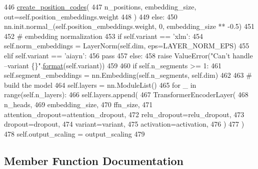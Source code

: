 \begin{DoxyCode}
446             \hyperlink{namespaceparlai_1_1agents_1_1transformer_1_1modules_a0b86437e6e9682fa3100e9cadcaae259}{create\_position\_codes}(
447                 n\_positions, embedding\_size, out=self.position\_embeddings.weight
448             )
449         \textcolor{keywordflow}{else}:
450             nn.init.normal\_(self.position\_embeddings.weight, 0, embedding\_size ** -0.5)
451 
452         \textcolor{comment}{# embedding normalization}
453         \textcolor{keywordflow}{if} self.variant == \textcolor{stringliteral}{'xlm'}:
454             self.norm\_embeddings = LayerNorm(self.dim, eps=LAYER\_NORM\_EPS)
455         \textcolor{keywordflow}{elif} self.variant == \textcolor{stringliteral}{'aiayn'}:
456             \textcolor{keywordflow}{pass}
457         \textcolor{keywordflow}{else}:
458             \textcolor{keywordflow}{raise} ValueError(\textcolor{stringliteral}{"Can't handle --variant \{\}"}.\hyperlink{namespaceparlai_1_1chat__service_1_1services_1_1messenger_1_1shared__utils_a32e2e2022b824fbaf80c747160b52a76}{format}(self.variant))
459 
460         \textcolor{keywordflow}{if} self.n\_segments >= 1:
461             self.segment\_embeddings = nn.Embedding(self.n\_segments, self.dim)
462 
463         \textcolor{comment}{# build the model}
464         self.layers = nn.ModuleList()
465         \textcolor{keywordflow}{for} \_ \textcolor{keywordflow}{in} range(self.n\_layers):
466             self.layers.append(
467                 TransformerEncoderLayer(
468                     n\_heads,
469                     embedding\_size,
470                     ffn\_size,
471                     attention\_dropout=attention\_dropout,
472                     relu\_dropout=relu\_dropout,
473                     dropout=dropout,
474                     variant=variant,
475                     activation=activation,
476                 )
477             )
478         self.output\_scaling = output\_scaling
479 
\end{DoxyCode}


\subsection{Member Function Documentation}
\mbox{\label{classparlai_1_1agents_1_1transformer_1_1modules_1_1TransformerEncoder_a23005871ba6683940f63511ed463266f}} 
